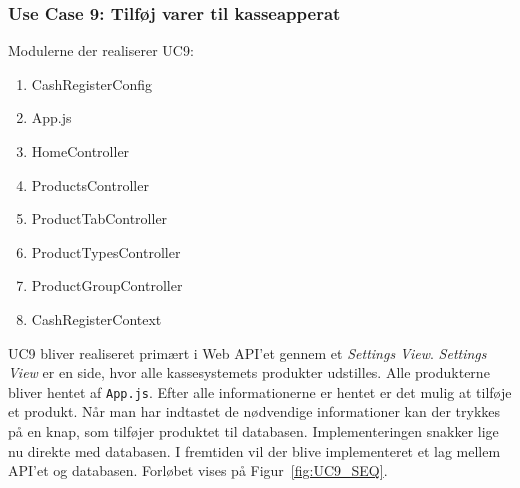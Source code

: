 \subsubsection{Use Case 9: Tilføj varer til kasseapperat}
Modulerne der realiserer UC9:
\begin{enumerate}
	\item CashRegisterConfig
	\item App.js
	\item HomeController
	\item ProductsController
	\item ProductTabController
	\item ProductTypesController
	\item ProductGroupController
	\item CashRegisterContext
\end{enumerate}

UC9 bliver realiseret primært i Web API'et gennem et \textit{Settings View}. \textit{Settings View} er en side, hvor alle kassesystemets produkter udstilles. Alle produkterne bliver hentet af \texttt{App.js}. Efter alle informationerne er hentet er det mulig at tilføje et produkt. Når man har indtastet de nødvendige informationer kan der trykkes på en knap, som tilføjer produktet til databasen. Implementeringen snakker lige nu direkte med databasen. I fremtiden vil der blive implementeret et lag mellem API'et og databasen. Forløbet vises på Figur~\ref{fig:UC9_SEQ}.

